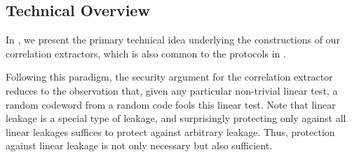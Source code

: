 \subsection{Technical Overview}\label{sec:overview}
In , we present the primary technical idea underlying the constructions of our correlation extractors,  which is also common to the protocols in \cite{ISIT:IMSW14,C:GIMS15}.




Following this paradigm, the security argument for the correlation extractor reduces to the observation that, given any particular non-trivial linear test, a random codeword from a random code fools this linear test. 
Note that linear leakage is a special type of leakage, and surprisingly protecting only against all linear leakages suffices to protect against arbitrary leakage. 
Thus, protection against linear leakage is not only necessary but also sufficient. 

